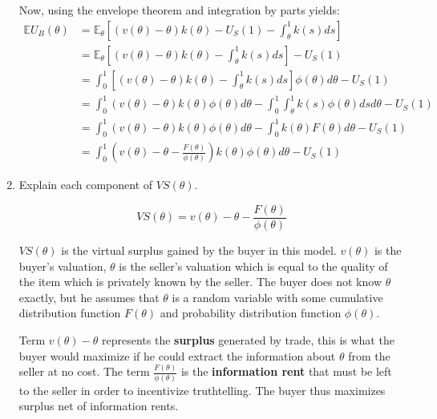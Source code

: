 \documentclass[a4paper]{article}
\begin{document}
\begin{enumerate}
	Now, using the envelope theorem and integration by parts yields:
	\begin{align*}
		\mathbb{E}U_B(\theta) &=\mathbb{E}_\theta[(v(\theta)-\theta)k(\theta)-U_S(1)-\int_\theta^1k(s)ds]
		\\
		&=\mathbb{E}_\theta[(v(\theta)-\theta)k(\theta)-\int_\theta^1k(s)ds]-U_S(1)
		\\
		&=\int_0^1 \left[(v(\theta)-\theta)k(\theta)-\int_\theta^1k(s)ds \right] \phi(\theta)d\theta-U_S(1)
		\\
		&=\int_0^1(v(\theta)-\theta)k(\theta)\phi(\theta)d\theta  -\int_0^1\int_\theta^1k(s) \phi(\theta) ds d\theta-U_S(1)
		\\
		&=\int_0^1(v(\theta)-\theta)k(\theta)\phi(\theta)d\theta-\int_0^1 k(\theta) F(\theta) d\theta -U_S(1)
		\\
		&=\int_0^1 \left(v(\theta)-\theta-\frac{F(\theta)}{\phi(\theta)} \right) k(\theta)\phi(\theta)d\theta -U_S(1)
	\end{align*}
	
	
	\item 
	Explain each component of $VS(\theta)$.
	
	$$ VS(\theta)=v(\theta)-\theta-\frac{F(\theta)}{\phi(\theta)} $$
	
	$VS(\theta)$ is the virtual surplus gained by the buyer in this model. $v(\theta)$ is the buyer's valuation, $\theta$ is the seller's valuation which is equal to the quality of the item which is privately known by the seller. The buyer does not know $\theta$ exactly, but he assumes that $\theta$ is a random variable with some cumulative distribution function $F(\theta)$ and probability distribution function $\phi(\theta)$.
	
	Term $v(\theta) - \theta$ represents the \textbf{surplus} generated by trade, this is what the buyer would maximize if he could extract the information about $\theta$ from the seller at no cost. The term $\frac{F(\theta)}{\phi(\theta)}$ is the \textbf{information rent} that must be left to the seller in order to incentivize truthtelling. The buyer thus maximizes surplus net of information rents.
	

\end{enumerate}
\end{document}
